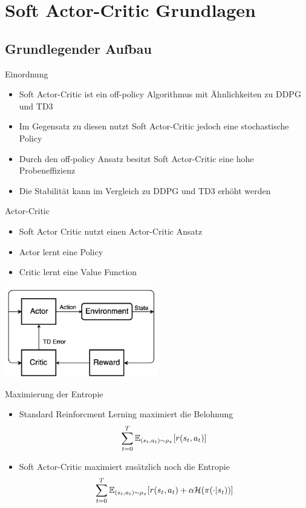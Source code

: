 \section{Soft Actor-Critic Grundlagen}
\subsection{Grundlegender Aufbau}
\begin{frame}{Einordnung}
	\begin{itemize}
		\item Soft Actor-Critic ist ein off-policy Algorithmus mit Ähnlichkeiten zu DDPG und TD3  
		\item Im Gegensatz zu diesen nutzt Soft Actor-Critic jedoch eine stochastische Policy
		\item Durch den off-policy Ansatz besitzt Soft Actor-Critic eine hohe Probeneffizienz 
		\item Die Stabilität kann im Vergleich zu DDPG und TD3 erhöht werden 
	\end{itemize} 
\end{frame}


\begin{frame}{Actor-Critic}
	\begin{itemize}
		\item Soft Actor Critic nutzt einen Actor-Critic Ansatz
		\item Actor lernt eine Policy
		\item Critic lernt eine Value Function
	\end{itemize} 
	\includegraphics[width=190pt]{figures/A-regular-actor-critic-model-TD-temporal-difference.png}
\end{frame}

\begin{frame}{Maximierung der Entropie}
	\begin{itemize}
		\item Standard Reinforcment Lerning maximiert die Belohnung
		\begin{equation}
			\sum_{t=0}^T \mathbb{E}_{(s_t,a_t)\sim\rho_\pi}[{\mathnormal{r}(s_t,a_t)}] \notag
		\end{equation}
		\item Soft Actor-Critic maximiert zusätzlich noch die Entropie
		\begin{equation}
			\sum_{t=0}^T \mathbb{E}_{(s_t,a_t)\sim\rho_\pi}[{\mathnormal{r}(s_t,a_t)} + \alpha \mathcal{H}(\pi(\cdot|s_t))] \notag
		\end{equation}
	\end{itemize} 
\end{frame}


